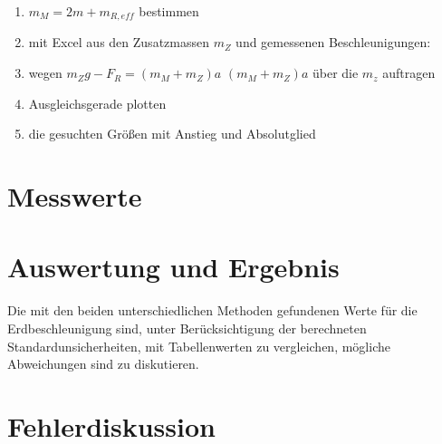 \documentclass{protokoll}
\begin{document}
\begin{enumerate}

\item $m_M = 2m + m_{R,eff}$ bestimmen
\item mit Excel aus den Zusatzmassen $m_Z$ und gemessenen Beschleunigungen:
\item wegen $m_Zg - F_R = (m_M + m_Z)a$ $(m_M + m_Z)a$ über die $m_z$ auftragen
\item Ausgleichsgerade plotten
\item die gesuchten Größen mit Anstieg und Absolutglied

\end{enumerate}


\section{Messwerte}



\section{Auswertung und Ergebnis}
Die mit den beiden unterschiedlichen Methoden gefundenen Werte für die Erdbeschleunigung sind,
unter Berücksichtigung der berechneten Standardunsicherheiten, mit Tabellenwerten zu vergleichen,
mögliche Abweichungen sind zu diskutieren.




\section{Fehlerdiskussion}
\end{document}
